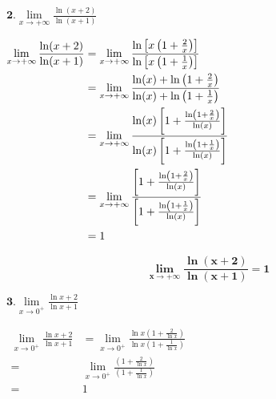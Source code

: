 \documentclass[12pt,a4paper]{article}
\begin{document}
\( \textbf{2.} \lim\limits_{x \to +\infty} \frac{\ln(x+2)}{\ln(x+1)} \)

\(
\begin{aligned}
    \lim\limits_{x \to +\infty} \frac{\ln(x+2)}{\ln(x+1)} & = \lim\limits_{x \to +\infty} \frac{\ln\left[x\left( 1+ \frac{2}{x}\right) \right]}{\ln\left[x\left( 1+ \frac{1}{x}\right) \right]}                                                      \\
                                                          & = \lim\limits_{x \to +\infty} \frac{ \ln(x) + \ln\left( 1+ \frac{2}{x}\right) }{ \ln(x) + \ln\left( 1+ \frac{1}{x}\right)}                                                               \\
                                                          & = \lim\limits_{x \to +\infty} \frac{ \ln(x) \left[ 1+ \frac{\ln\left( 1+ \frac{2}{x}\right)}{\ln(x)} \right] }{ \ln(x) \left[ 1+ \frac{\ln\left( 1+ \frac{1}{x}\right)}{\ln(x)} \right]} \\
                                                          & = \lim\limits_{x \to +\infty} \frac{ \left[ 1+ \frac{\ln\left( 1+ \frac{2}{x}\right)}{\ln(x)} \right] }{ \left[1+ \frac{\ln\left( 1+ \frac{1}{x}\right)}{\ln(x)} \right]}                \\
                                                          & = 1                                                                                                                                                                                      \\
\end{aligned}\\
\)

\begin{resultbox}
    \[
        \mathbf{\lim\limits_{x \to +\infty} \frac{\ln(x+2)}{\ln(x+1)}=1}
    \]
\end{resultbox}

\( \textbf{3.} \lim\limits_{x \to 0^+} \frac{\ln x+2}{\ln x+1} \)

\(
\begin{aligned}
    \lim\limits_{x \to 0^+} \frac{\ln x+2}{\ln x+1} & =\lim\limits_{x \to 0^+} \frac{\ln x\left(1+\frac{2}{\ln x}\right)}{\ln x\left(1+\frac{1}{\ln x}\right)} \\
    =                                               & \lim\limits_{x \to 0^+} \frac{\left(1+\frac{2}{\ln x}\right)}{\left(1+\frac{1}{\ln x}\right)}            \\
    =                                               & 1
\end{aligned}
\)
\end{document}
